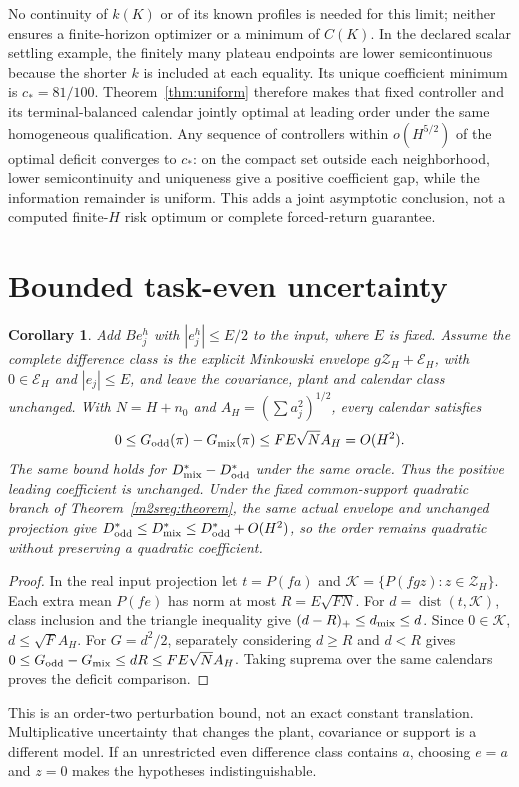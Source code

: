 \documentclass[11pt]{article}
\newtheorem{corollary}{Corollary}
\begin{document}
No continuity of $k(K)$ or of its known profiles is needed for this limit;
neither ensures a finite-horizon optimizer or a minimum of $C(K)$.
In the declared scalar settling example, the finitely many plateau endpoints
are lower semicontinuous because the shorter $k$ is included at each equality.
Its unique coefficient minimum is $c_*=81/100$.
Theorem~\ref{thm:uniform} therefore makes that fixed controller and its
terminal-balanced calendar jointly optimal at leading order under the same
homogeneous qualification. Any sequence of controllers within
$o(H^{5/2})$ of the optimal deficit converges to $c_*$: on the compact set
outside each neighborhood, lower semicontinuity and uniqueness give a positive
coefficient gap, while the information remainder is uniform.
This adds a joint asymptotic conclusion, not a computed finite-$H$ risk optimum
or complete forced-return guarantee.

\section{Bounded task-even uncertainty}
\begin{corollary}\label{cor:even}
Add $Be_j^h$ with $|e_j^h|\le E/2$ to the input, where $E$ is fixed.
Assume the complete difference class is the explicit Minkowski envelope
$g\mathcal Z_H+\mathcal E_H$, with $0\in\mathcal E_H$ and
$|e_j|\le E$, and leave the covariance, plant and calendar class unchanged.
With $N=H+n_0$ and $A_H=(\sum a_j^2)^{1/2}$, every calendar satisfies
\[
0\le G_{\rm odd}(\pi)-G_{\rm mix}(\pi)
\le FE\sqrt N A_H=O(H^2).
\]
The same bound holds for $D_{\rm mix}^*-D_{\rm odd}^*$ under the same oracle.
Thus the positive leading coefficient is unchanged. Under the fixed
common-support quadratic branch of Theorem~\ref{m2sreg:theorem}, the same
actual envelope and unchanged projection give
$D_{\rm odd}^*\le D_{\rm mix}^*\le D_{\rm odd}^*+O(H^2)$,
so the order remains quadratic without preserving a quadratic coefficient.
\end{corollary}
\begin{proof}
In the real input projection let $t=P(fa)$ and
$\mathcal K=\{P(fgz):z\in\mathcal Z_H\}$.
Each extra mean $P(fe)$ has norm at most $R=E\sqrt{FN}$.
For $d=\operatorname{dist}(t,\mathcal K)$, class inclusion and the triangle
inequality give $(d-R)_+\le d_{\rm mix}\le d$.
Since $0\in\mathcal K$, $d\le\sqrt F A_H$.
For $G=d^2/2$, separately considering $d\ge R$ and $d<R$ gives
$0\le G_{\rm odd}-G_{\rm mix}\le dR\le FE\sqrt N A_H$.
Taking suprema over the same calendars proves the deficit comparison.
\end{proof}
This is an order-two perturbation bound, not an exact constant translation.
Multiplicative uncertainty that changes the plant, covariance or support is a
different model. If an unrestricted even difference class contains $a$,
choosing $e=a$ and $z=0$ makes the hypotheses indistinguishable.
\end{document}

